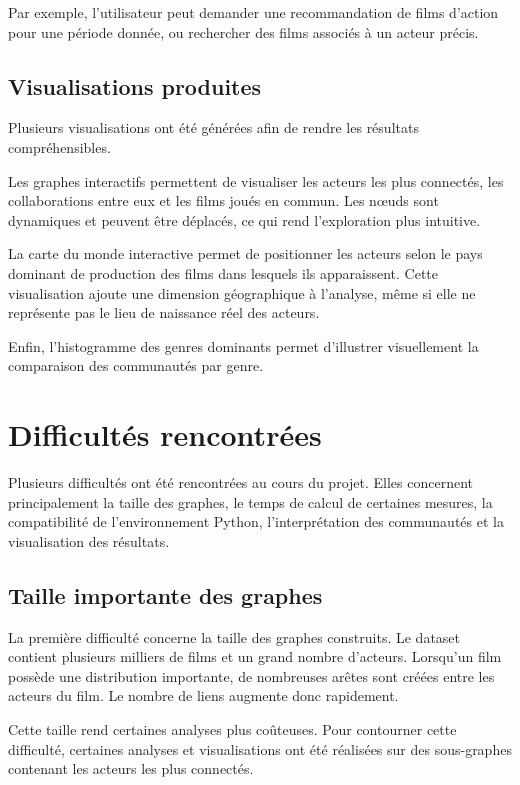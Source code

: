 \documentclass[11pt,a4paper,oneside,openany]{report}
\begin{document}
Par exemple, l’utilisateur peut demander une recommandation de films d’action pour une période donnée, ou rechercher des films associés à un acteur précis.

\section{Visualisations produites}

Plusieurs visualisations ont été générées afin de rendre les résultats compréhensibles.

Les graphes interactifs permettent de visualiser les acteurs les plus connectés, les collaborations entre eux et les films joués en commun. Les nœuds sont dynamiques et peuvent être déplacés, ce qui rend l’exploration plus intuitive.

La carte du monde interactive permet de positionner les acteurs selon le pays dominant de production des films dans lesquels ils apparaissent. Cette visualisation ajoute une dimension géographique à l’analyse, même si elle ne représente pas le lieu de naissance réel des acteurs.

Enfin, l’histogramme des genres dominants permet d’illustrer visuellement la comparaison des communautés par genre.

\chapter{Difficultés rencontrées}

Plusieurs difficultés ont été rencontrées au cours du projet. Elles concernent principalement la taille des graphes, le temps de calcul de certaines mesures, la compatibilité de l’environnement Python, l’interprétation des communautés et la visualisation des résultats.

\section{Taille importante des graphes}

La première difficulté concerne la taille des graphes construits. Le dataset contient plusieurs milliers de films et un grand nombre d’acteurs. Lorsqu’un film possède une distribution importante, de nombreuses arêtes sont créées entre les acteurs du film. Le nombre de liens augmente donc rapidement.

Cette taille rend certaines analyses plus coûteuses. Pour contourner cette difficulté, certaines analyses et visualisations ont été réalisées sur des sous-graphes contenant les acteurs les plus connectés.
\end{document}
